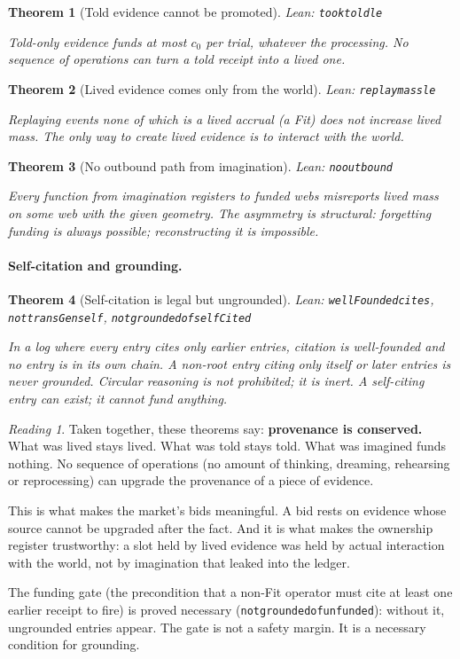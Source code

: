 \documentclass[11pt]{article}
\newcommand{\leanus}{\textunderscore\allowbreak}
\newcommand{\lean}[1]{{\let\_\leanus\texttt{#1}}}
\newtheorem{theorem}{Theorem}[section]
\theoremstyle{remark}
\newtheorem*{reading}{Reading}
\begin{document}
\begin{theorem}[Told evidence cannot be promoted]
{\small\sloppy Lean: \lean{took\_told\_le}\par}
Told-only evidence funds at most $c_0$ per trial, whatever the processing. No sequence of
operations can turn a told receipt into a lived one.
\end{theorem}

\begin{theorem}[Lived evidence comes only from the world]
{\small\sloppy Lean: \lean{replay\_mass\_le}\par}
Replaying events none of which is a lived accrual (a Fit) does not increase lived mass.
The only way to create lived evidence is to interact with the world.
\end{theorem}

\begin{theorem}[No outbound path from imagination]
{\small\sloppy Lean: \lean{no\_outbound}\par}
Every function from imagination registers to funded webs misreports lived mass on some web
with the given geometry. The asymmetry is structural: forgetting funding is always
possible; reconstructing it is impossible.
\end{theorem}

\paragraph{Self-citation and grounding.}

\begin{theorem}[Self-citation is legal but ungrounded]
{\small\sloppy Lean: \lean{wellFounded\_cites}, \lean{not\_transGen\_self},
\lean{not\_grounded\_of\_selfCited}\par}
In a log where every entry cites only earlier entries, citation is well-founded and no
entry is in its own chain. A non-root entry citing only itself or later entries is never
grounded. Circular reasoning is not prohibited; it is inert. A self-citing entry can exist; it
cannot fund anything.
\end{theorem}

\begin{reading}
Taken together, these theorems say: \textbf{provenance is conserved.} What was lived stays
lived. What was told stays told. What was imagined funds nothing. No sequence of
operations (no amount of thinking, dreaming, rehearsing or reprocessing) can upgrade the
provenance of a piece of evidence.

This is what makes the market's bids meaningful. A bid rests on evidence whose source
cannot be upgraded after the fact. And it is what makes the ownership register
trustworthy: a slot held by lived evidence was held by actual interaction with the world,
not by imagination that leaked into the ledger.

The funding gate (the precondition that a non-Fit operator must cite at least one earlier
receipt to fire) is proved necessary (\lean{not\_grounded\_of\_unfunded}): without it,
ungrounded entries appear. The gate is not a safety margin. It is a necessary condition
for grounding.
\end{reading}
\end{document}
